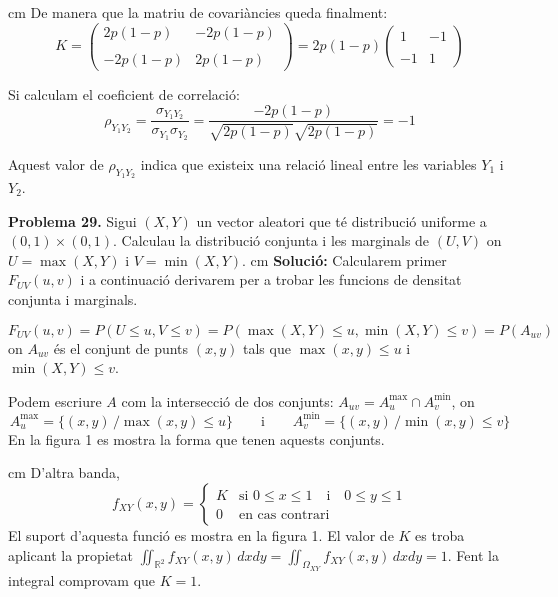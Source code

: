 \documentclass{article}
\newcommand\R{\mathbb{R}}
\begin{document}
 cm
\noindent
De manera que la matriu de covari\`ancies queda finalment:
\[
K=\begin{pmatrix} 2p(1-p) & -2p(1-p) \\ \\ -2p(1-p) & 2p(1-p) \end{pmatrix} = 2p(1-p) \begin{pmatrix} 1 & -1 \\ \\ -1 & 1 \end{pmatrix}
\]



\vskip 0.2cm
\noindent
Si calculam el coeficient de correlaci\'o:
\[
\rho_{Y_1 Y_2}= \frac{ \sigma_{Y_1 Y_2} }{ \sigma_{Y_1} \sigma_{Y_2} }=\frac{-2p(1-p)}{\sqrt{2p(1-p)} \sqrt{2p(1-p)}}=-1
\]

\noindent
Aquest valor de $\rho_{Y_1 Y_2}$ indica que existeix una relaci\'o lineal entre les variables $Y_1$ i $Y_2$.




\newpage
\noindent
\textbf{Problema 29.}  
Sigui $(X,Y)$ un vector aleatori que t\'e distribuci\'o uniforme
a $(0,1)\times(0,1)$. Calculau la distribuci\'o conjunta i les
marginals de $(U,V)$ on $U=\max(X,Y)$ i $V=\min(X,Y)$.
 cm
\noindent
\textbf{Soluci\'o:} Calcularem primer $F_{UV}(u, v)$ i a continuaci\'o derivarem
per a trobar les funcions de densitat conjunta i marginals.

\[
F_{UV}(u, v)=P(U \leq u, V \leq v)=P(\max(X, Y) \leq u, \min(X, Y) \leq v)=P(A_{uv})
\]
\noindent
on $A_{uv}$ \'es el conjunt de punts $(x, y)$ tals que $\max(x, y) \leq u$ i $\min(X, Y) \leq v$.

\noindent
Podem escriure $A$ com la intersecci\'o de dos conjunts: $A_{uv}=A_{u}^{\max} \cap A_{v}^{\min}$,
on 
\[
A_{u}^{\max}=\{ (x, y) \, / \max(x, y) \leq u \} \qquad \text{i} \qquad
A_{v}^{\min}=\{ (x, y) \, / \min(x, y) \leq v \}
\]
\noindent
En la figura 1 es mostra la forma que tenen aquests conjunts. 

 cm
\noindent
D'altra banda,
\[
f_{XY}(x, y)=\begin{cases} K & \text{si } 0 \leq x \leq 1 \quad \text{i} \quad 0 \leq y \leq 1 \\ 
0 & \text{en cas contrari} \end{cases}
\]
\noindent
El suport d'aquesta funci\'o es mostra en la figura 1. El valor de $K$ es troba aplicant la propietat
$\iint_{\R^2} f_{XY}(x, y) \, dxdy=\iint_{\Omega_{XY}} f_{XY}(x, y) \, dxdy= 1$. Fent la integral comprovam que $K=1$.
\end{document}
